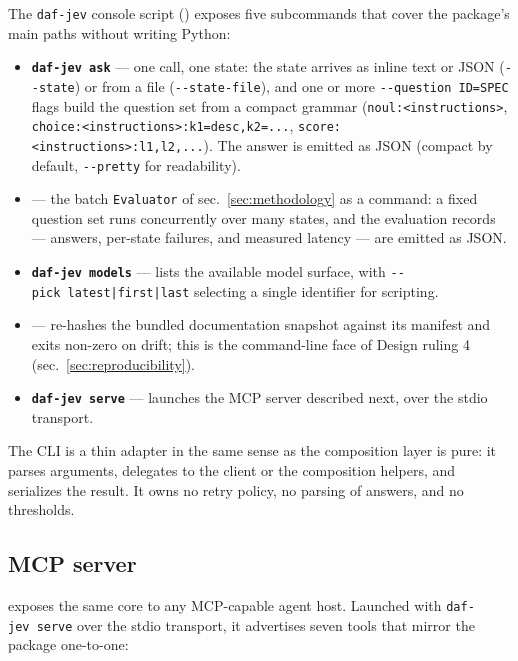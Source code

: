 \documentclass[
  english,
]{article}
\providecommand{\tightlist}{%
  \setlength{\itemsep}{0pt}\setlength{\parskip}{0pt}}
\begin{document}
The \texttt{daf-jev} console script ()
exposes five subcommands that cover the package's main paths without
writing Python:

\begin{itemize}
\tightlist
\item
  \textbf{\texttt{daf-jev\ ask}} --- one call, one state: the state
  arrives as inline text or JSON (\texttt{-\/-state}) or from a file
  (\texttt{-\/-state-file}), and one or more
  \texttt{-\/-question\ ID=SPEC} flags build the question set from a
  compact grammar (\texttt{noul:\textless{}instructions\textgreater{}},
  \texttt{choice:\textless{}instructions\textgreater{}:k1=desc,k2=...},
  \texttt{score:\textless{}instructions\textgreater{}:l1,l2,...}). The
  answer is emitted as JSON (compact by default, \texttt{-\/-pretty} for
  readability).
\item
  \textbf{} --- the batch \texttt{Evaluator}
  of sec.~\ref{sec:methodology} as a command: a fixed question set runs
  concurrently over many states, and the evaluation records --- answers,
  per-state failures, and measured latency --- are emitted as JSON.
\item
  \textbf{\texttt{daf-jev\ models}} --- lists the available model
  surface, with \texttt{-\/-pick\ latest|{}first|{}last}
  selecting a single identifier for scripting.
\item
  \textbf{} --- re-hashes the bundled
  documentation snapshot against its manifest and exits non-zero on
  drift; this is the command-line face of Design ruling 4
  (sec.~\ref{sec:reproducibility}).
\item
  \textbf{\texttt{daf-jev\ serve}} --- launches the MCP server described
  next, over the stdio transport.
\end{itemize}

The CLI is a thin adapter in the same sense as the composition layer is
pure: it parses arguments, delegates to the client or the composition
helpers, and serializes the result. It owns no retry policy, no parsing
of answers, and no thresholds.

\subsection{MCP server}\label{mcp-server}

 exposes the same core to any
MCP-capable agent host. Launched with \texttt{daf-jev\ serve} over the
stdio transport, it advertises seven tools that mirror the package
one-to-one:
\end{document}
